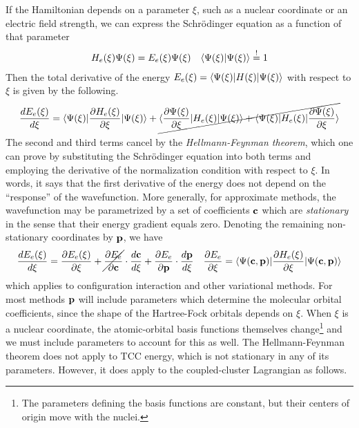 \documentclass[11pt]{article}
\numberwithin{equation}{section}
\begin{document}
\begin{samepage}
\begin{rmk}
If the Hamiltonian depends on a parameter $\xi$, such as a nuclear coordinate or an electric field strength, we can express the Schr\"odinger equation as a function of that parameter
\begin{align}
\label{eq:xi-dependent-schrodinger-equation}
  H_e(\xi)
  \Y(\xi)
=
  E_e(\xi)
  \Y(\xi)
&&
  \ip{\Y(\xi)|\Y(\xi)}
\overset{!}{=}
  1
\end{align}
Then the total derivative of the energy $E_e(\xi)=\ip{\Y(\xi)|H(\xi)|\Y(\xi)}$ with respect to $\xi$ is given by the following.
\begin{align}
  \fd{E_e(\xi)}{\xi}
=
  \ip{\Y(\xi)|
  \pd{H_e(\xi)}{\xi}
  |\Y(\xi)}
+
\cancel{
  \ip{\pd{\Y(\xi)}{\xi}|
  H_e(\xi)
  |\Y(\xi)}
+
  \ip{\Y(\xi)|
  H_e(\xi)
  |\pd{\Y(\xi)}{\xi}}
}
\end{align}
The second and third terms cancel by the \textit{Hellmann-Feynman theorem}, which one can prove by substituting the Schr\"odinger equation into both terms and employing the derivative of the normalization condition with respect to $\xi$.
In words, it says that the first derivative of the energy does not depend on the  ``response'' of the wavefunction.
More generally, for approximate methods, the wavefunction may be parametrized by a set of coefficients $\mathbf{c}$ which are \textit{stationary} in the sense that their energy gradient equals zero.
Denoting the remaining non-stationary coordinates by $\mathbf{p}$, we have
\begin{align}
  \fd{E_e(\xi)}{\xi}
=
  \pd{E_e(\xi)}{\xi}
+
  \cancel{
  \pd{E_e}{\bo{c}}
  }
  \cdot
  \fd{\bo{c}}{\xi}
+
  \pd{E_e}{\bo{p}}
  \cdot
  \fd{\bo{p}}{\xi}
&&
  \pd{E_e}{\xi}
=
  \ip{\Y(\bo{c},\bo{p})|
  \pd{H_e(\xi)}{\xi}
  |\Y(\bo{c},\bo{p})}
\end{align}
which applies to configuration interaction and other variational methods.
For most methods $\mathbf{p}$ will include parameters which determine the molecular orbital coefficients, since the shape of the Hartree-Fock orbitals depends on $\xi$.
When $\xi$ is a nuclear coordinate, the atomic-orbital basis functions themselves change\footnote{The parameters defining the basis functions are constant, but their centers of origin move with the nuclei.}
and we must include parameters to account for this as well.
The Hellmann-Feynman theorem does not apply to TCC energy, which is not stationary in any of its parameters.
However, it does apply to the coupled-cluster Lagrangian as follows.

\end{rmk}
\end{samepage}
\end{document}
